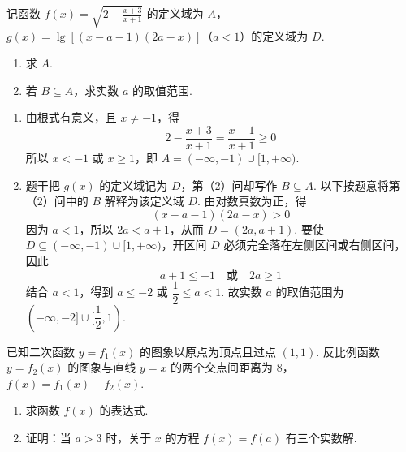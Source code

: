 \begin{problem}
记函数 \( f(x) = \sqrt{2 - \frac{x + 3}{x + 1}} \) 的定义域为 \(A\)，\( g(x) = \lg [(x - a - 1)(2a - x)]\)（\(a < 1\)）的定义域为 \(D\).

\begin{enumerate}
\item 求 \(A\).
\item 若 \(B \subseteq A\)，求实数 \(a\) 的取值范围.
\end{enumerate}
\end{problem}

\begin{solution}
\begin{enumerate}
\item 由根式有意义，且 \(x\neq-1\)，得
\[
2-\frac{x+3}{x+1}=\frac{x-1}{x+1}\geqslant0
\]
所以 \(x<-1\) 或 \(x\geqslant1\)，即 \(A=(-\infty,-1)\cup[1,+\infty)\).

\item 题干把 \(g(x)\) 的定义域记为 \(D\)，第（2）问却写作 \(B\subseteq A\). 以下按题意将第（2）问中的 \(B\) 解释为该定义域 \(D\). 由对数真数为正，得
\[
(x-a-1)(2a-x)>0
\]
因为 \(a<1\)，所以 \(2a<a+1\)，从而 \(D=(2a,a+1)\). 要使 \(D\subseteq(-\infty,-1)\cup[1,+\infty)\)，开区间 \(D\) 必须完全落在左侧区间或右侧区间，因此
\[
a+1\leqslant-1\quad\text{或}\quad 2a\geqslant1
\]
结合 \(a<1\)，得到 \(a\leqslant-2\) 或 \(\dfrac{1}{2}\leqslant a<1\). 故实数 \(a\) 的取值范围为 \((-\infty,-2]\cup[\dfrac{1}{2},1)\).
\end{enumerate}
\end{solution}

\begin{problem}
已知二次函数 \( y = f_{1}(x) \) 的图象以原点为顶点且过点 \((1,1)\). 反比例函数 \( y = f_{2}(x) \) 的图象与直线 \( y = x \) 的两个交点间距离为 \(8\)，\( f(x) = f_{1}(x) + f_{2}(x) \).

\begin{enumerate}
\item 求函数 \( f(x) \) 的表达式.
\item 证明：当 \(a > 3\) 时，关于 \(x\) 的方程 \(f(x) = f(a)\) 有三个实数解.
\end{enumerate}
\end{problem}

